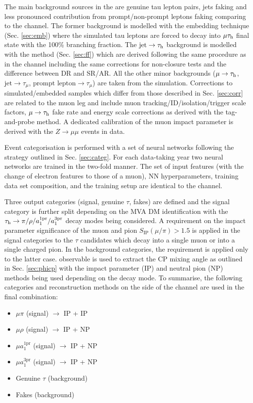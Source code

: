 The main background sources in the \mt are genuine tau lepton pairs, jets faking \tauh and less pronounced contribution from prompt/non-prompt leptons faking \tauh comparing to the \et channel. The former background is modelled with the embedding technique (Sec. \ref{sec:emb}) where the simulated tau leptons are forced to decay into $\mu\tau_\mathrm{h}$ final state with the 100\% branching fraction. The $\text{jet} \to \tau_\mathrm{h}$ background is modelled with the \ff method (Sec. \ref{sec:ff}) which are derived following the same procedure as in the \et channel including the same corrections for non-closure tests and the difference between DR and SR/AR. All the other minor backgrounds ($\mu \to \tau_\mathrm{h}$, $\text{jet} \to \tau_\mu$, $\text{prompt lepton} \to \tau_\mu$) are taken from the simulation. Corrections to simulated/embedded samples which differ from those described in Sec. \ref{sec:corr} are related to the muon leg and include muon tracking/ID/isolation/trigger scale factors, $\mu \to \tau_\mathrm{h}$ fake rate and energy scale corrections as derived with the tag-and-probe method. A dedicated calibration of the muon impact parameter is derived with the $Z\to\mu\mu$ events in data.

Event categorisation is performed with a set of neural networks following the strategy outlined in Sec. \ref{sec:categ}. For each data-taking year two neural networks are trained in the two-fold manner. The set of input features (with the change of electron features to those of a muon), NN hyperparameters, training data set composition, and the training setup are identical to the \et channel. 

Three output categories (signal, genuine $\tau$, fakes) are defined and the signal category is further split depending on the \tauh MVA DM identification with the $\tau_\mathrm{h} \to \pi/\rho/a_1^\text{1pr}/a_1^\text{3pr}$ decay modes being considered. A requirement on the impact parameter significance of the muon and pion $S_\text{IP} (\mu/\pi) > 1.5$ is applied in the signal categories to the $\tau$ candidates which decay into a single muon or into a single charged pion. In the background categories, the requirement is applied only to the latter case. \phicp observable is used to extract the CP mixing angle \mixa as outlined in Sec. \ref{sec:phicp} with the impact parameter (IP) and neutral pion (NP) methods being used depending on the \tauh decay mode. To summarise, the following categories and \phicp reconstruction methods on the side of the \mt channel are used in the final combination:  

\begin{itemize}
    \item $\mu\pi$ (signal) $\longrightarrow$ IP + IP
    \item $\mu\rho$ (signal) $\longrightarrow$ IP + NP
    \item $\mu a_1^\text{1pr}$ (signal) $\longrightarrow$ IP + NP
    \item $\mu a_1^\text{3pr}$ (signal) $\longrightarrow$ IP + NP
    \item Genuine $\tau$ (background)
    \item Fakes (background)
\end{itemize}

